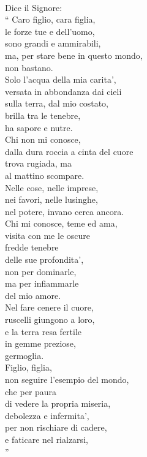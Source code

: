 \begin{vcentered}
\leavevmode\\
    Dice il Signore: \\\enquote{
Caro figlio, cara figlia,\\
    le forze tue e dell'uomo, \\
    sono grandi e ammirabili, \\
    ma, per stare bene in questo mondo, \\
    non bastano.\\
    Solo l'acqua della mia carita', \\
    versata in abbondanza dai cieli\\
    sulla terra, dal mio costato,\\
    brilla tra le tenebre, \\
    ha sapore e nutre.\\
Chi non mi conosce,\\
dalla dura roccia a cinta del cuore\\
trova rugiada, ma\\
al mattino scompare.\\
Nelle cose, nelle imprese,\\
nei favori, nelle lusinghe,\\
nel potere, invano cerca ancora.\\
Chi mi conosce, teme ed ama,\\
visita con me le oscure\\
    fredde tenebre \\
    delle sue profondita', \\
    non per dominarle, \\
    ma per infiammarle \\
    del mio amore. \\
Nel fare cenere il cuore,\\
ruscelli giungono a loro,\\
e la terra resa fertile\\
    in gemme preziose,\\
germoglia.\\
Figlio, figlia, \\
    non seguire l'esempio del mondo,\\
    che per paura \\
    di vedere la propria miseria, \\
    debolezza e infermita', \\
    per non rischiare di cadere, \\
    e faticare nel rialzarsi,\\
}
\end{vcentered}
